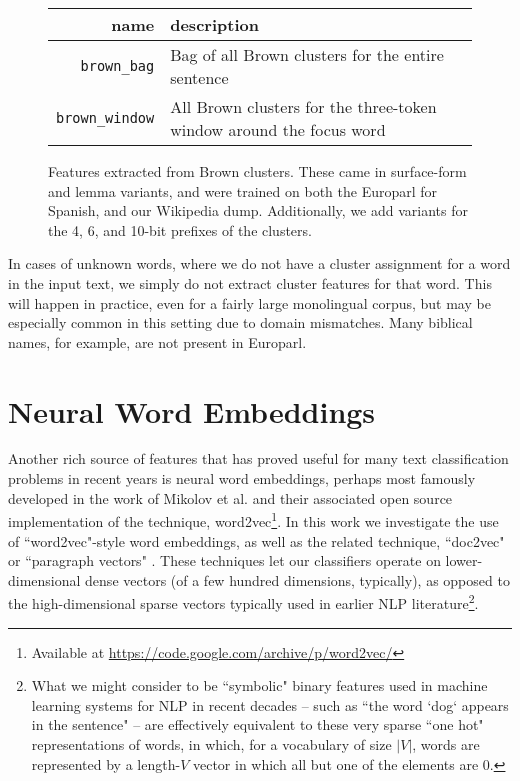 \begin{figure*}
  \begin{centering}
  \begin{tabular}{|r|p{11cm}|}
    \hline
    name          & description  \\
    \hline
    \texttt{brown\_bag}    & Bag of all Brown clusters for the entire sentence \\
    \hline
    \texttt{brown\_window}  & All Brown clusters for the three-token window around the focus word \\
    \hline
  \end{tabular}
  \end{centering}
  \caption{Features extracted from Brown clusters. These came in surface-form
  and lemma variants, and were trained on both the Europarl for Spanish, and
  our Wikipedia dump. Additionally, we add variants for the 4, 6, and 10-bit
  prefixes of the clusters.}
  \label{fig:brownfeatures}
\end{figure*}

In cases of unknown words, where we do not have a cluster assignment for a word
in the input text, we simply do not extract cluster features for that word.
This will happen in practice, even for a fairly large monolingual corpus, but
may be especially common in this setting due to domain mismatches. Many
biblical names, for example, are not present in Europarl.

\section{Neural Word Embeddings}
Another rich source of features that has proved useful for many text
classification problems in recent years is neural word embeddings, perhaps most
famously developed in the work of Mikolov et al. \cite{mikolovword2vec} and
their associated open source implementation of the technique,
word2vec\footnote{Available at
\url{https://code.google.com/archive/p/word2vec/}}. In this work we investigate
the use of ``word2vec"-style word embeddings, as well as the related technique,
``doc2vec" or ``paragraph vectors"
\cite{dai-document-embedding-2015,quocle-distributed-representations-2014}.
These techniques let our classifiers operate on lower-dimensional dense vectors
(of a few hundred dimensions, typically), as opposed to the high-dimensional
sparse vectors typically used in earlier NLP literature\footnote{
What we might consider to be ``symbolic" binary features used in machine
learning systems for NLP in recent decades -- such as ``the word `dog` appears
in the sentence" -- are effectively equivalent to these very sparse ``one hot"
representations of words, in which, for a vocabulary of size $|V|$, words are
represented by a length-$V$ vector in which all but one of the elements are
0.}.

